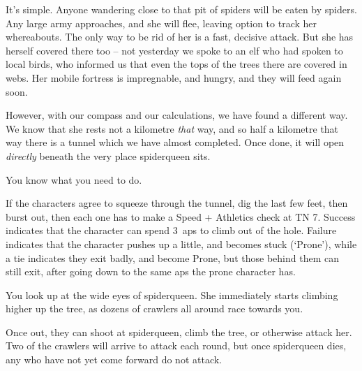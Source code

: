 \begin{speechtext}
  It's simple.
  Anyone wandering close to that pit of spiders will be eaten by spiders.
  Any large army approaches, and she will flee, leaving option to track her whereabouts.
  The only way to be rid of her is a fast, decisive attack.
  But she has herself covered there too -- not yesterday we spoke to an elf who had spoken to local birds, who informed us that even the tops of the trees there are covered in webs.
  Her mobile fortress is impregnable, and hungry, and they will feed again soon.

  However, with our compass and our calculations, we have found a different way.
  We know that she rests not a kilometre \emph{that} way, and so half a kilometre that way there is a tunnel which we have almost completed.
  Once done, it will open \emph{directly} beneath the very place \gls{spiderqueen} sits.

  You know what you need to do.
\end{speechtext}

If the characters agree to squeeze through the tunnel, dig the last few feet, then burst out, then each one has to make a Speed + Athletics check at TN 7.
Success indicates that the character can spend 3~\glspl{ap} to climb out of the hole.
Failure indicates that the character pushes up a little, and becomes stuck (`Prone'),%
while a tie indicates they exit badly, and become Prone, but those behind them can still exit, after going down to the same \glspl{ap} the prone character has.

\begin{boxtext}
  You look up at the wide eyes of \gls{spiderqueen}.
  She immediately starts climbing higher up the tree, as dozens of \glspl{crawler} all around race towards you.
\end{boxtext}

Once out, they can shoot at \gls{spiderqueen}, climb the tree, or otherwise attack her.
Two of the \glspl{crawler} will arrive to attack each round, but once \gls{spiderqueen} dies, any who have not yet come forward do not attack.

\keras

\showStdSpells




